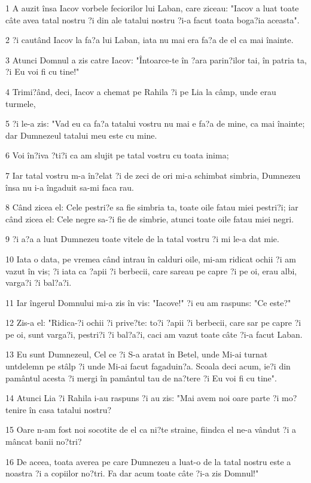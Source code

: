 \par 1 A auzit însa Iacov vorbele feciorilor lui Laban, care ziceau: "Iacov a luat toate câte avea tatal nostru ?i din ale tatalui nostru ?i-a facut toata boga?ia aceasta".
\par 2 ?i cautând Iacov la fa?a lui Laban, iata nu mai era fa?a de el ca mai înainte.
\par 3 Atunci Domnul a zis catre Iacov: "Întoarce-te în ?ara parin?ilor tai, în patria ta, ?i Eu voi fi cu tine!"
\par 4 Trimi?ând, deci, Iacov a chemat pe Rahila ?i pe Lia la câmp, unde erau turmele,
\par 5 ?i le-a zis: "Vad eu ca fa?a tatalui vostru nu mai e fa?a de mine, ca mai înainte; dar Dumnezeul tatalui meu este cu mine.
\par 6 Voi în?iva ?ti?i ca am slujit pe tatal vostru cu toata inima;
\par 7 Iar tatal vostru m-a în?elat ?i de zeci de ori mi-a schimbat simbria, Dumnezeu însa nu i-a îngaduit sa-mi faca rau.
\par 8 Când zicea el: Cele pestri?e sa fie simbria ta, toate oile fatau miei pestri?i; iar când zicea el: Cele negre sa-?i fie de simbrie, atunci toate oile fatau miei negri.
\par 9 ?i a?a a luat Dumnezeu toate vitele de la tatal vostru ?i mi le-a dat mie.
\par 10 Iata o data, pe vremea când intrau în calduri oile, mi-am ridicat ochii ?i am vazut în vis; ?i iata ca ?apii ?i berbecii, care sareau pe capre ?i pe oi, erau albi, varga?i ?i bal?a?i.
\par 11 Iar îngerul Domnului mi-a zis în vis: "Iacove!" ?i eu am raspuns: "Ce este?"
\par 12 Zis-a el: "Ridica-?i ochii ?i prive?te: to?i ?apii ?i berbecii, care sar pe capre ?i pe oi, sunt varga?i, pestri?i ?i bal?a?i, caci am vazut toate câte ?i-a facut Laban.
\par 13 Eu sunt Dumnezeul, Cel ce ?i S-a aratat în Betel, unde Mi-ai turnat untdelemn pe stâlp ?i unde Mi-ai facut fagaduin?a. Scoala deci acum, ie?i din pamântul acesta ?i mergi în pamântul tau de na?tere ?i Eu voi fi cu tine".
\par 14 Atunci Lia ?i Rahila i-au raspuns ?i au zis: "Mai avem noi oare parte ?i mo?tenire în casa tatalui nostru?
\par 15 Oare n-am fost noi socotite de el ca ni?te straine, fiindca el ne-a vândut ?i a mâncat banii no?tri?
\par 16 De aceea, toata averea pe care Dumnezeu a luat-o de la tatal nostru este a noastra ?i a copiilor no?tri. Fa dar acum toate câte ?i-a zis Domnul!"
